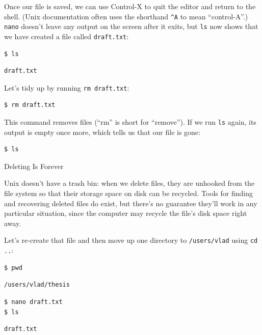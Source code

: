 \documentclass{book}
\begin{document}
Once our file is saved, we can use Control-X to quit the editor and
return to the shell. (Unix documentation often uses the shorthand
\texttt{\^{}A} to mean ``control-A''.) \texttt{nano} doesn't leave any
output on the screen after it exits, but \texttt{ls} now shows that we
have created a file called \texttt{draft.txt}:

\begin{verbatim}
$ ls
\end{verbatim}

\begin{verbatim}
draft.txt
\end{verbatim}

Let's tidy up by running \texttt{rm draft.txt}:

\begin{verbatim}
$ rm draft.txt
\end{verbatim}

This command removes files (``rm'' is short for ``remove''). If we run
\texttt{ls} again, its output is empty once more, which tells us that
our file is gone:

\begin{verbatim}
$ ls
\end{verbatim}

\begin{swcbox}{Deleting Is Forever}

Unix doesn't have a trash bin: when we delete files, they are unhooked
from the file system so that their storage space on disk can be
recycled. Tools for finding and recovering deleted files do exist, but
there's no guarantee they'll work in any particular situation, since the
computer may recycle the file's disk space right away.

\end{swcbox}

Let's re-create that file and then move up one directory to
\texttt{/users/vlad} using \texttt{cd ..}:

\begin{verbatim}
$ pwd
\end{verbatim}

\begin{verbatim}
/users/vlad/thesis
\end{verbatim}

\begin{verbatim}
$ nano draft.txt
$ ls
\end{verbatim}

\begin{verbatim}
draft.txt
\end{verbatim}
\end{document}
